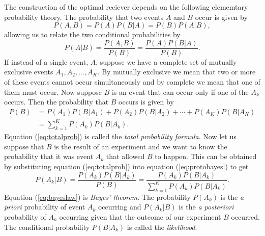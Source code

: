 The construction of the optimal reciever depends on the following elememtary
probability theory. The probability that two events $A$ and $B$ occur
is given by
\begin{equation}
P(A,B) = P(A) P(B|A) = P(B) P(A|B),
\label{eq:probproduct}
\end{equation}
allowing us to relate the two conditional probabilities by
\begin{equation}
P(A|B) = \frac{P(A,B)}{P(B)} = \frac{P(A)P(B|A)}{P(B)}.
\label{eq:protobayes}
\end{equation}
If instead of a single event, $A$, suppose we have a complete set of mutually
exclusive events $A_1, A_2, \ldots, A_K$. By mutually exclusive we mean that
two or more of these events cannot occur simultaneously and by complete we
mean that one of them must occur. Now suppose $B$ is an event that
can occur only if one of the $A_k$ occurs. Then the probability that $B$
occurs is given by
\begin{equation}
\begin{split}
P(B) &= P(A_1)P(B|A_1) + P(A_2)P(B|A_2) + \cdots + P(A_K)P(B|A_K) \\
     &= \sum_{k=1}^K P(A_k)P(B|A_k).
\end{split}
\label{eq:totalprob}
\end{equation}
Equation (\ref{eq:totalprob}) is called the \emph{total probability formula}.
Now let us suppose that $B$ is the result of an experiment and we want to know
the probability that it was event $A_k$ that allowed $B$ to happen. This can
be obtained by substituting equation (\ref{eq:totalprob}) into equation
(\ref{eq:protobayes}) to get
\begin{equation}
P(A_k|B) = \frac{P(A_k)P(B|A_k)}{P(B)} 
= \frac{P(A_k)P(B|A_k)}{\sum_{k=1}^K P(A_k)P(B|A_k)}.
\label{eq:bayeslaw}
\end{equation}
Equation (\ref{eq:bayeslaw}) is \emph{Bayes' theorem}. The probability
$P(A_k)$ is the \emph{a priori} probability of event $A_k$ occurring and
$P(A_k|B)$ is the \emph{a posteriori} probability of $A_k$ occurring given
that the outcome of our experiment $B$ occurred. The conditional probability
$P(B|A_k)$ is called the \emph{likelihood}.

